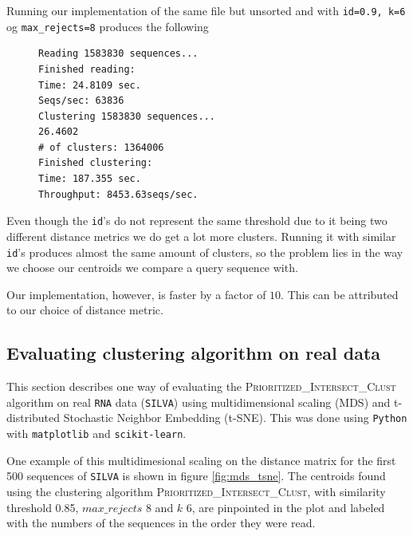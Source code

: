 Running our implementation of the same file but unsorted and with
\texttt{id=0.9, k=6} og \texttt{max\_rejects=8} produces the following

\begin{figure}[H]
\begin{lstlisting}[style=output-style]
Reading 1583830 sequences...
Finished reading:
Time: 24.8109 sec.
Seqs/sec: 63836
Clustering 1583830 sequences...
26.4602
# of clusters: 1364006
Finished clustering:
Time: 187.355 sec.
Throughput: 8453.63seqs/sec.
\end{lstlisting}
\end{figure}

Even though the \texttt{id}'s do not represent the same threshold due to it
being two different distance metrics we do get a lot more clusters. Running
it with similar \texttt{id}'s produces almost the same amount of clusters, so
the problem lies in the way we choose our centroids we compare a query
sequence with.

Our implementation, however, is faster by a factor of $10$. This can be
attributed to our choice of distance metric.



\subsection{Evaluating clustering algorithm on real data}

This section describes one way of evaluating the
\textsc{Prioritized\_Intersect\_Clust} algorithm on real \texttt{RNA} data
(\texttt{SILVA}) using multidimensional scaling (MDS) and t-distributed
Stochastic Neighbor Embedding (t-SNE). This was done using \texttt{Python} with
\texttt{matplotlib} and \texttt{scikit-learn}.

One example of this
multidimesional scaling on the distance matrix for the first 500 sequences of
\texttt{SILVA} is shown in figure \ref{fig:mds_tsne}. The centroids found using
the clustering algorithm \textsc{Prioritized\_Intersect\_Clust}, with similarity
threshold 0.85, $max\_rejects$ 8 and $k$ 6, are pinpointed in the plot and
labeled with the numbers of the sequences in the order they were read.

